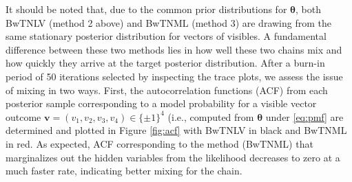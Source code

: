 \documentclass[]{article}
\theoremstyle{definition}
\begin{document}
It should be noted that, due to the common prior distributions for
\(\boldsymbol \theta\), both BwTNLV (method 2 above) and BwTNML (method
3) are drawing from the same stationary posterior distribution for
vectors of visibles. A fundamental difference between these two methods
lies in how well these two chains mix and how quickly they arrive at the
target posterior distribution. After a burn-in period of 50 iterations
selected by inspecting the trace plots, we assess the issue of mixing in
two ways. First, the autocorrelation functions (ACF) from each posterior
sample corresponding to a model probability for a visible vector outcome
\(\mathbf{v}=(v_1,v_2,v_3,v_4)\in\{\pm 1\}^4\) (i.e., computed from
\(\boldsymbol \theta\) under \eqref{eq:pmf} are determined and plotted in
Figure \ref{fig:acf} with BwTNLV in black and BwTNML in red. As
expected, ACF corresponding to the method (BwTNML) that marginalizes out
the hidden variables from the likelihood decreases to zero at a much
faster rate, indicating better mixing for the chain.
\end{document}
